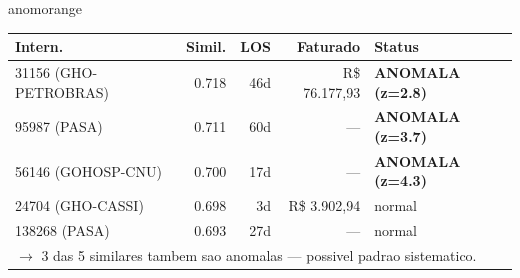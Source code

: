 \documentclass[a4paper,10pt]{article}
\begin{document}
\begin{anomalycard}[Internacao 165684 | GHO-PETROBRAS | ALTO (z=4.22)]{anomorange}
\begin{tabular}{l r r r l}\toprule\textbf{Intern.} & \textbf{Simil.} & \textbf{LOS} & \textbf{Faturado} & \textbf{Status} \\\midrule
31156 (GHO-PETROBRAS) & 0.718 & 46d & R\$ 76.177,93 & \textcolor{anomred}{\textbf{ANOMALA (z=2.8)}} \\
95987 (PASA) & 0.711 & 60d & --- & \textcolor{anomred}{\textbf{ANOMALA (z=3.7)}} \\
56146 (GOHOSP-CNU) & 0.700 & 17d & --- & \textcolor{anomred}{\textbf{ANOMALA (z=4.3)}} \\
24704 (GHO-CASSI) & 0.698 & 3d & R\$ 3.902,94 & \textcolor{jcubeblue}{normal} \\
138268 (PASA) & 0.693 & 27d & --- & \textcolor{jcubeblue}{normal} \\
\multicolumn{5}{l}{\textcolor{anomred}{\small $\rightarrow$ 3 das 5 similares tambem sao anomalas --- possivel padrao sistematico.}} \\
\bottomrule\end{tabular}



\end{anomalycard}

\newpage
\end{document}
